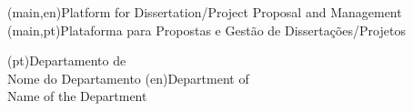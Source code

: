 
%




\nttitle(main,en){Platform for Dissertation/Project Proposal and Management}%
\nttitle(main,pt){Plataforma para Propostas e Gestão de Dissertações/Projetos}%





\ntdepartment*(pt){Departamento de\\Nome do Departamento}
\ntdepartment*(en){Department of\\Name of the Department}



